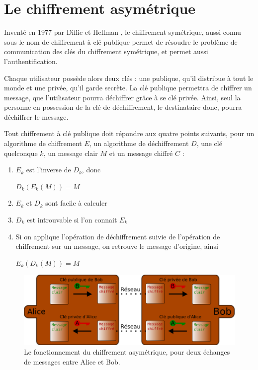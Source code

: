 \section{Le chiffrement asymétrique}
Inventé en 1977 par Diffie et Hellman
\cite{NewDirectionsInCryptography}, le chiffrement symétrique, aussi
connu sous le nom de chiffrement à clé publique permet de résoudre le
problème de communication des clés du chiffrement symétrique, et
permet aussi l'authentification. 

Chaque utilisateur possède alors deux clés : une publique, qu'il
distribue à tout le monde et une privée, qu'il garde secrète. La clé
publique permettra de chiffrer un message, que l'utilisateur pourra
déchiffrer grâce à se clé privée. Ainsi, seul la personne en
possession de la clé de déchiffrement, le destinataire donc, pourra
déchiffrer le message.

Tout chiffrement à clé publique doit répondre aux quatre points
suivants, pour un algorithme de chiffrement $E$, un algorithme de
déchiffrement $D$, une clé quelconque $k$, un message clair $M$ et un
message chiffré $C$ : 
\begin{enumerate}
  \item $E_k$ est l'inverse de $D_k$, donc
    \begin{center}
      $D_k(E_k(M)) = M$
    \end{center}
  \item $E_k$ et $D_k$ sont facile à calculer
  \item $D_k$ est introuvable si l'on connait $E_k$
  \item Si on applique l'opération de déchiffrement suivie de
    l'opération de chiffrement sur un message, on retrouve le message
    d'origine, ainsi
    \begin{center}
      $E_k(D_k(M)) = M$
    \end{center}
\end{enumerate}


\begin{figure}[h]
  \begin{center}
    \includegraphics[scale=0.5]{images/ChiffrementAsymetrique.png}
  \end{center}
  \caption{Le fonctionnement du chiffrement asymétrique, pour deux
    échanges de messages entre Alice et Bob.}
  \label{fig:ChiffrementSymetrique}
\end{figure}
